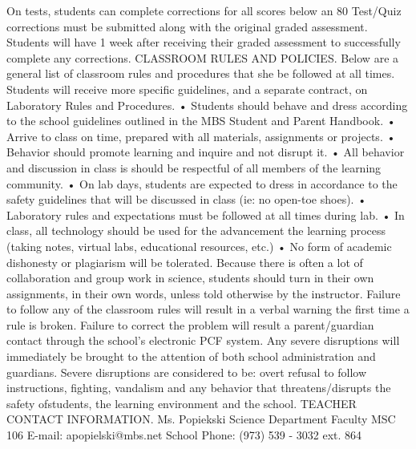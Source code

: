 On tests, students can complete corrections for all scores below an 80%
Test/Quiz corrections must be submitted along with the original graded assessment.
Students will have 1 week after receiving their graded assessment to successfully complete
any corrections.
CLASSROOM RULES AND POLICIES.
Below are a general list of classroom rules and procedures that she be followed at all times.
Students will receive more specific guidelines, and a separate contract, on Laboratory Rules
and Procedures.
• Students should behave and dress according to the school guidelines outlined in the MBS
Student and Parent Handbook.
• Arrive to class on time, prepared with all materials, assignments or projects.
• Behavior should promote learning and inquire and not disrupt it.
• All behavior and discussion in class is should be respectful of all members of the learning
community.
• On lab days, students are expected to dress in accordance to the safety guidelines that will
be discussed in class (ie: no open-toe shoes).
• Laboratory rules and expectations must be followed at all times during lab.
• In class, all technology should be used for the advancement the learning process (taking notes,
virtual labs, educational resources, etc.)
• No form of academic dishonesty or plagiarism will be tolerated. Because there is often a lot of
collaboration and group work in science, students should turn in their own assignments, in
their own words, unless told otherwise by the instructor.
Failure to follow any of the classroom rules will result in a verbal warning the first time a rule is
broken.
Failure to correct the problem will result a parent/guardian contact through the school’s
electronic PCF system. Any severe disruptions will immediately be brought to the attention of
both school administration and guardians. Severe disruptions are considered to be: overt refusal
to follow instructions, fighting, vandalism and any behavior that threatens/disrupts the safety ofstudents, the learning environment and the school.
TEACHER CONTACT INFORMATION.
Ms. Popiekski
Science Department Faculty
MSC 106
E-mail: apopielski@mbs.net
School Phone: (973) 539 - 3032 ext. 864
